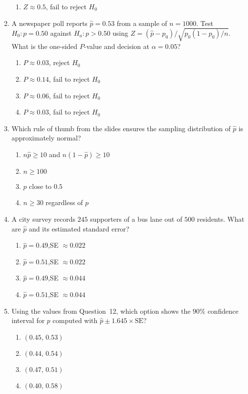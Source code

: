 \documentclass{article}
\begin{document}
\begin{enumerate}
\begin{enumerate}[label=(\Alph*)]
  \item $Z\approx0.5$, fail to reject $H_0$
  \end{enumerate}
\item A newspaper poll reports $\hat{p}=0.53$ from a sample of $n=1000$. Test $H_0:p=0.50$ against $H_a:p>0.50$ using $Z=(\hat{p}-p_0)/\sqrt{p_0(1-p_0)/n}$. What is the one-sided $P$-value and decision at $\alpha=0.05$?
  \begin{enumerate}[label=(\Alph*)]
  \item $P\approx0.03$, reject $H_0$
  \item $P\approx0.14$, fail to reject $H_0$
  \item $P\approx0.06$, fail to reject $H_0$
  \item $P\approx0.03$, fail to reject $H_0$
  \end{enumerate}
\item Which rule of thumb from the slides ensures the sampling distribution of $\hat{p}$ is approximately normal?
  \begin{enumerate}[label=(\Alph*)]
  \item $n\hat{p}\ge10$ and $n(1-\hat{p})\ge10$
  \item $n\ge100$
  \item $p$ close to $0.5$
  \item $n\ge30$ regardless of $p$
  \end{enumerate}
\item A city survey records $245$ supporters of a bus lane out of $500$ residents. What are $\hat{p}$ and its estimated standard error?
  \begin{enumerate}[label=(\Alph*)]
  \item $\hat{p}=0.49$,\quad SE $\approx0.022$
  \item $\hat{p}=0.51$,\quad SE $\approx0.022$
  \item $\hat{p}=0.49$,\quad SE $\approx0.044$
  \item $\hat{p}=0.51$,\quad SE $\approx0.044$
  \end{enumerate}
\item Using the values from Question~12, which option shows the $90\%$ confidence interval for $p$ computed with $\hat{p}\pm1.645\times\text{SE}$?
  \begin{enumerate}[label=(\Alph*)]
  \item $(0.45,\,0.53)$
  \item $(0.44,\,0.54)$
  \item $(0.47,\,0.51)$
  \item $(0.40,\,0.58)$

\end{enumerate}
\end{enumerate}
\end{document}
